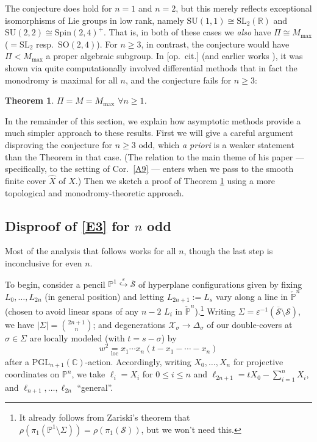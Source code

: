 \documentclass[12pt,letterpaper,english]{amsart}
\numberwithin{equation}{section}
\numberwithin{figure}{section}
\theoremstyle{plain}
\newtheorem{thm}[equation]{Theorem}
\theoremstyle{remark}
\theoremstyle{definition}
\theoremstyle{definition}
\theoremstyle{plain}
\theoremstyle{plain}
\theoremstyle{plain}
\theoremstyle{plain}
\theoremstyle{definition}
\def\RR{\mathbb{R}}
\def\CC{\mathbb{C}}
\def\PP{\mathbb{P}}
\def\X{\mathcal{X}}
\def\ve{\varepsilon}
\def\sm{\setminus}
\def\cs{\mathcal{S}}
\def\csb{\overline{\cs}}
\theoremstyle{definition}
\begin{document}
The conjecture does hold for $n=1$ and $n=2$, but this merely reflects exceptional isomorphisms of Lie groups in low rank, namely $\mathrm{SU}(1,1)\cong \mathrm{SL}_2(\RR)$ and $\mathrm{SU}(2,2)\cong\mathrm{Spin}(2,4)^+$. That is, in both of these cases we \emph{also} have $\Pi\cong M_{\max}$ ($=\mathrm{SL}_2$ resp.~$\mathrm{SO}(2,4)$). For $n\geq 3$, in contrast, the conjecture would have $\Pi<M_{\max}$ a proper algebraic subgroup. In [op.~cit.] (and earlier works \cite{GSVZ,GSZ,GSZ2}), it was shown via quite computationally involved differential methods that in fact the monodromy is maximal for all $n$, and the conjecture fails for $n\geq 3$:

\begin{thm}\label{E4}
$\Pi=M=M_{\max}$ $\forall n\geq 1$.
\end{thm}

In the remainder of this section, we explain how asymptotic methods provide a much simpler approach to these results.  First we will give a careful argument disproving the conjecture for $n\geq 3$ odd, which \emph{a priori} is a weaker statement than the Theorem in that case. (The relation to the main theme of his paper --- specifically, to the setting of Cor.~\ref{A9} --- enters when we pass to the smooth finite cover $\hat{X}$ of $X$.) Then we sketch a proof of Theorem \ref{E4} using a more topological and monodromy-theoretic approach.

\subsection*{Disproof of \eqref{E3} for $n$ odd}

Most of the analysis that follows works for all $n$, though the last step is inconclusive for even $n$.

To begin, consider a pencil $\PP^1\overset{\ve}{\hookrightarrow}\csb$ of hyperplane configurations given by fixing $L_0,\ldots,L_{2n}$ (in general position) and letting $L_{2n+1}:=L_s$ vary along a line in $\check{\PP}^n$ (chosen to avoid linear spans of any $n-2$ $L_i$ in $\check{\PP}^n$).\footnote{It already follows from Zariski's theorem \cite[Thm.~3.22]{Vo} that $\rho(\pi_1(\PP^1\sm\Sigma))=\rho(\pi_1(\cs))$, but we won't need this.} Writing $\Sigma=\ve^{-1}(\csb\sm\cs)$, we have $|\Sigma|=\binom{2n+1}{n}$; and degenerations $\X_{\sigma}\to \Delta_{\sigma}$ of our double-covers at $\sigma\in \Sigma$ are locally modeled (with $t=s-\sigma$) by 
\begin{equation}\label{E5}
w^2\underset{\text{loc}}{=}x_1\cdots x_n(t-x_1-\cdots -x_n)	
\end{equation}
after a $\mathrm{PGL}_{n+1}(\CC)$-action. Accordingly, writing $X_0,\ldots,X_n$ for projective coordinates on $\PP^n$, we take $\ell_i=X_i$ for $0\leq i\leq n$ and $\ell_{2n+1}=tX_0-\sum_{i=1}^n X_i$, and $\ell_{n+1},\ldots,\ell_{2n}$ ``general''.
\end{document}

